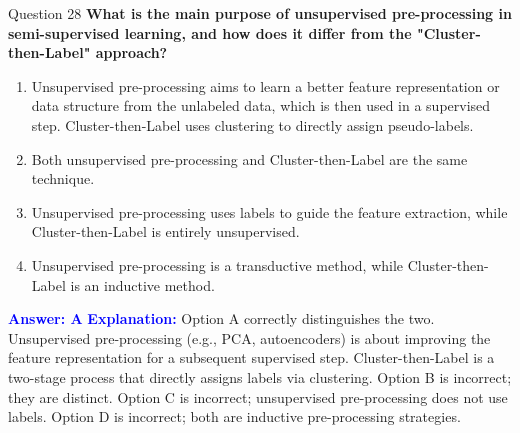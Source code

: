 \documentclass{beamer}
\begin{document}
	\begin{frame}{Question 28}
		\textbf{What is the main purpose of unsupervised pre-processing in semi-supervised learning, and how does it differ from the "Cluster-then-Label" approach?}
		\begin{enumerate}
			\item Unsupervised pre-processing aims to learn a better feature representation or data structure from the unlabeled data, which is then used in a supervised step. Cluster-then-Label uses clustering to directly assign pseudo-labels.
			\item Both unsupervised pre-processing and Cluster-then-Label are the same technique.
			\item Unsupervised pre-processing uses labels to guide the feature extraction, while Cluster-then-Label is entirely unsupervised.
			\item Unsupervised pre-processing is a transductive method, while Cluster-then-Label is an inductive method.
		\end{enumerate}
		\vspace{0.2cm}
		\textcolor{blue}{\textbf{Answer: A}}
		\vspace{0.2cm}
		\textcolor{blue}{\textbf{Explanation:}} Option A correctly distinguishes the two. Unsupervised pre-processing (e.g., PCA, autoencoders) is about improving the feature representation for a subsequent supervised step. Cluster-then-Label is a two-stage process that directly assigns labels via clustering. Option B is incorrect; they are distinct. Option C is incorrect; unsupervised pre-processing does not use labels. Option D is incorrect; both are inductive pre-processing strategies.
	\end{frame}
	
\end{document}
